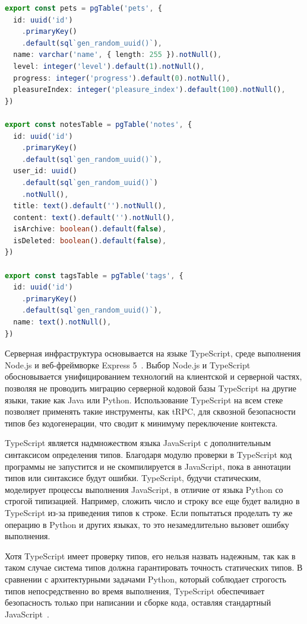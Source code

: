 \documentclass[a4paper,14pt]{extreport}
\begin{document}
\begin{lstlisting}[language=TypeScript, caption={Описание схемы сущностей pets, notes и tags в Drizzle ORM}, label={lst:drizzle-schema}]
export const pets = pgTable('pets', {
  id: uuid('id')
    .primaryKey()
    .default(sql`gen_random_uuid()`),
  name: varchar('name', { length: 255 }).notNull(),
  level: integer('level').default(1).notNull(),
  progress: integer('progress').default(0).notNull(),
  pleasureIndex: integer('pleasure_index').default(100).notNull(),
})

export const notesTable = pgTable('notes', {
  id: uuid('id')
    .primaryKey()
    .default(sql`gen_random_uuid()`),
  user_id: uuid()
    .default(sql`gen_random_uuid()`)
    .notNull(),
  title: text().default('').notNull(),
  content: text().default('').notNull(),
  isArchive: boolean().default(false),
  isDeleted: boolean().default(false),
})

export const tagsTable = pgTable('tags', {
  id: uuid('id')
    .primaryKey()
    .default(sql`gen_random_uuid()`),
  name: text().notNull(),
})
\end{lstlisting}

Серверная инфраструктура основывается на языке TypeScript, среде выполнения Node.js и веб-фреймворке Express 5~\cite{ref_kashyaro}. Выбор Node.js и TypeScript обосновывается унифицированием технологий на клиентской и серверной частях, позволяя не проводить миграцию серверной кодовой базы TypeScript на другие языки, такие как Java или Python. Использование TypeScript на всем стеке позволяет применять такие инструменты, как tRPC, для сквозной безопасности типов без кодогенерации, что сводит к минимуму переключение контекста.

TypeScript является надмножеством языка JavaScript с дополнительным синтаксисом определения типов. Благодаря модулю проверки в TypeScript код программы не запустится и не скомпилируется в JavaScript, пока в аннотации типов или синтаксисе будут ошибки. TypeScript, будучи статическим, моделирует процессы выполнения JavaScript, в отличие от языка Python со строгой типизацией. Например, сложить число и строку все еще будет валидно в TypeScript из-за приведения типов к строке. Если попытаться проделать ту же операцию в Python и других языках, то это незамедлительно вызовет ошибку выполнения.

Хотя TypeScript имеет проверку типов, его нельзя назвать надежным, так как в таком случае система типов должна гарантировать точность статических типов. В сравнении с архитектурными задачами Python, который соблюдает строгость типов непосредственно во время выполнения, TypeScript обеспечивает безопасность только при написании и сборке кода, оставляя стандартный JavaScript~\cite{ref_vanderkam}.
\end{document}
